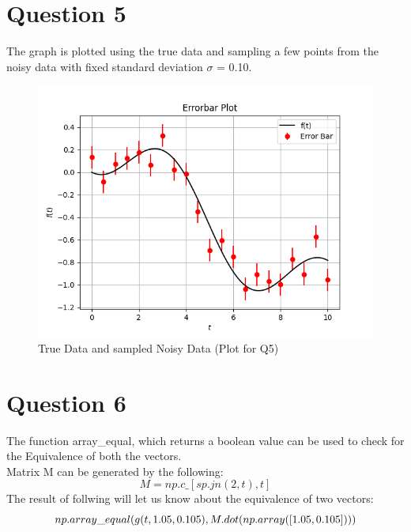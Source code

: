 \documentclass[11pt, a4paper]{article}
\begin{document}
          \section{Question 5} 
            The graph is plotted using the true data and sampling a few points from the noisy data with fixed standard deviation $\sigma$ = 0.10.
            \begin{figure}[H]
                \centering
                \includegraphics[scale=0.9]{Figure1.png}
                \caption{True Data and sampled Noisy Data (Plot for Q5)}
                
            \end{figure}
            
          \section{Question 6}
            The function {array\_equal}, which returns a boolean value can be used to check for the Equivalence of both the vectors.\\
            Matrix M can be generated by the following:
            \begin{equation}        M = np.c\_[sp.jn( 2, t), t]      \end{equation}   
            The result of follwing will let us know about the equivalence of two vectors:
            \begin{equation} np.array\_equal( g ( t, 1.05, \-0.105) , M.dot(np.array([ 1.05, \-0.105]))) \end{equation}  
            
\end{document}
